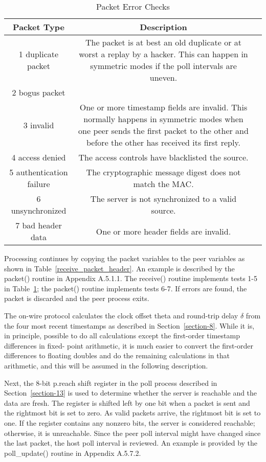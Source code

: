 \begin{description}
    \begin{table}[htb]
    \center
    \begin{tabular}{c | c | c}
    Packet Type & Description \\
    \hline
    \hline
    1 duplicate packet & The packet is at best an old duplicate or at worst a replay by a hacker. This can happen in symmetric modes if the poll intervals are uneven. \\
    2 bogus packet & \\
    3 invalid & One or more timestamp fields are invalid. This normally happens in symmetric modes when one peer sends the first packet to the other and before the other has received its first reply. \\
    4 access denied & The access controls have blacklisted the source. \\
    5 authentication failure & The cryptographic message digest does not match the MAC. \\
    6 unsynchronized & The server is not synchronized to a valid source. \\
    7 bad header data & One or more header fields are invalid. \\
    \hline
    \end{tabular}
    \label{packet_error_checks}
    \caption{Packet Error Checks}
    \end{table}

\end{description}

Processing continues by copying the packet variables to the peer
variables as shown in Table~\ref{receive_packet_header}. An example is described by the
packet() routine in Appendix A.5.1.1. The receive() routine
implements tests 1-5 in Table~\ref{packet_error_checks}; the packet() routine implements
tests 6-7. If errors are found, the packet is discarded and the peer
process exits.

The on-wire protocol calculates the clock offset theta and round-trip
delay $ \delta $ from the four most recent timestamps as described in
Section~\ref{section-8}. While it is, in principle, possible to do all
calculations except the first-order timestamp differences in fixed-
point arithmetic, it is much easier to convert the first-order
differences to floating doubles and do the remaining calculations in
that arithmetic, and this will be assumed in the following
description.

Next, the 8-bit p.reach shift register in the poll process described
in Section~\ref{section-13} is used to determine whether the server is reachable
and the data are fresh. The register is shifted left by one bit when
a packet is sent and the rightmost bit is set to zero. As valid
packets arrive, the rightmost bit is set to one. If the register
contains any nonzero bits, the server is considered reachable;
otherwise, it is unreachable. Since the peer poll interval might
have changed since the last packet, the host poll interval is
reviewed. An example is provided by the poll\_update() routine in
Appendix A.5.7.2.

